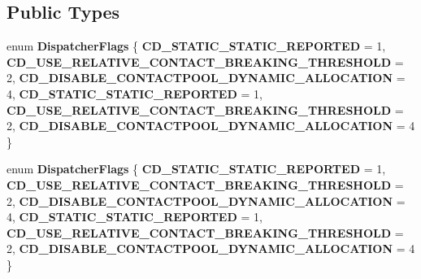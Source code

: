\subsection*{Public Types}
\begin{DoxyCompactItemize}
\item 
\mbox{\label{classbtCollisionDispatcher_a9aa413a2145825d052e73ae1d22aee93}} 
enum {\bfseries Dispatcher\+Flags} \{ \newline
{\bfseries C\+D\+\_\+\+S\+T\+A\+T\+I\+C\+\_\+\+S\+T\+A\+T\+I\+C\+\_\+\+R\+E\+P\+O\+R\+T\+ED} = 1, 
{\bfseries C\+D\+\_\+\+U\+S\+E\+\_\+\+R\+E\+L\+A\+T\+I\+V\+E\+\_\+\+C\+O\+N\+T\+A\+C\+T\+\_\+\+B\+R\+E\+A\+K\+I\+N\+G\+\_\+\+T\+H\+R\+E\+S\+H\+O\+LD} = 2, 
{\bfseries C\+D\+\_\+\+D\+I\+S\+A\+B\+L\+E\+\_\+\+C\+O\+N\+T\+A\+C\+T\+P\+O\+O\+L\+\_\+\+D\+Y\+N\+A\+M\+I\+C\+\_\+\+A\+L\+L\+O\+C\+A\+T\+I\+ON} = 4, 
{\bfseries C\+D\+\_\+\+S\+T\+A\+T\+I\+C\+\_\+\+S\+T\+A\+T\+I\+C\+\_\+\+R\+E\+P\+O\+R\+T\+ED} = 1, 
\newline
{\bfseries C\+D\+\_\+\+U\+S\+E\+\_\+\+R\+E\+L\+A\+T\+I\+V\+E\+\_\+\+C\+O\+N\+T\+A\+C\+T\+\_\+\+B\+R\+E\+A\+K\+I\+N\+G\+\_\+\+T\+H\+R\+E\+S\+H\+O\+LD} = 2, 
{\bfseries C\+D\+\_\+\+D\+I\+S\+A\+B\+L\+E\+\_\+\+C\+O\+N\+T\+A\+C\+T\+P\+O\+O\+L\+\_\+\+D\+Y\+N\+A\+M\+I\+C\+\_\+\+A\+L\+L\+O\+C\+A\+T\+I\+ON} = 4
 \}
\item 
\mbox{\label{classbtCollisionDispatcher_a9aa413a2145825d052e73ae1d22aee93}} 
enum {\bfseries Dispatcher\+Flags} \{ \newline
{\bfseries C\+D\+\_\+\+S\+T\+A\+T\+I\+C\+\_\+\+S\+T\+A\+T\+I\+C\+\_\+\+R\+E\+P\+O\+R\+T\+ED} = 1, 
{\bfseries C\+D\+\_\+\+U\+S\+E\+\_\+\+R\+E\+L\+A\+T\+I\+V\+E\+\_\+\+C\+O\+N\+T\+A\+C\+T\+\_\+\+B\+R\+E\+A\+K\+I\+N\+G\+\_\+\+T\+H\+R\+E\+S\+H\+O\+LD} = 2, 
{\bfseries C\+D\+\_\+\+D\+I\+S\+A\+B\+L\+E\+\_\+\+C\+O\+N\+T\+A\+C\+T\+P\+O\+O\+L\+\_\+\+D\+Y\+N\+A\+M\+I\+C\+\_\+\+A\+L\+L\+O\+C\+A\+T\+I\+ON} = 4, 
{\bfseries C\+D\+\_\+\+S\+T\+A\+T\+I\+C\+\_\+\+S\+T\+A\+T\+I\+C\+\_\+\+R\+E\+P\+O\+R\+T\+ED} = 1, 
\newline
{\bfseries C\+D\+\_\+\+U\+S\+E\+\_\+\+R\+E\+L\+A\+T\+I\+V\+E\+\_\+\+C\+O\+N\+T\+A\+C\+T\+\_\+\+B\+R\+E\+A\+K\+I\+N\+G\+\_\+\+T\+H\+R\+E\+S\+H\+O\+LD} = 2, 
{\bfseries C\+D\+\_\+\+D\+I\+S\+A\+B\+L\+E\+\_\+\+C\+O\+N\+T\+A\+C\+T\+P\+O\+O\+L\+\_\+\+D\+Y\+N\+A\+M\+I\+C\+\_\+\+A\+L\+L\+O\+C\+A\+T\+I\+ON} = 4
 \}
\end{DoxyCompactItemize}
